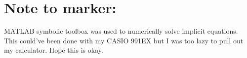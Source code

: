 \section*{Note to marker:}
MATLAB symbolic toolbox was used to numerically solve implicit equations. This could've been done with my CASIO 991EX but I was too lazy to pull out my calculator. Hope this is okay.
